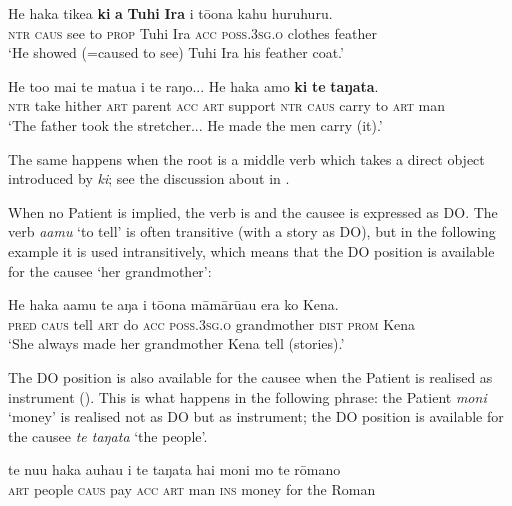 \ea\label{ex:8.234}
\gll He haka tike{\ꞌ}a \textbf{ki} \textbf{a} \textbf{Tuhi} \textbf{Ira} i tō{\ꞌ}ona kahu huruhuru. \\
\textsc{ntr} \textsc{caus} see to \textsc{prop} Tuhi Ira \textsc{acc} \textsc{poss.3sg.o} clothes feather \\

\glt 
‘He showed (=caused to see) Tuhi Ira his feather coat.’ \textstyleExampleref{[Fel-33-011]}
\z

\ea\label{ex:8.235}
\gll He to{\ꞌ}o mai te matu{\ꞌ}a i te raŋo... He haka {\ꞌ}amo \textbf{ki} \textbf{te} \textbf{taŋata}.\\
\textsc{ntr} take hither \textsc{art} parent \textsc{acc} \textsc{art} support \textsc{ntr} \textsc{caus} carry to \textsc{art} man\\

\glt
‘The father took the stretcher... He made the men carry (it).’ \textstyleExampleref{[Mtx-7-13.044]}
\z

The same happens when the root is a middle verb which takes a direct object introduced by \textit{ki}; see the discussion about  in .

When no Patient is implied, the verb is  and the causee is expressed as DO. The verb \textit{{\ꞌ}a{\ꞌ}amu} ‘to tell’ is often transitive (with a story as DO), but in the following example it is used intransitively, which means that the DO position is available for the causee ‘her grandmother’:

\ea\label{ex:8.236}
\gll He haka {\ꞌ}a{\ꞌ}amu te aŋa i tō{\ꞌ}ona māmārū{\ꞌ}au era ko Kena. \\
\textsc{pred} \textsc{caus} tell \textsc{art} do \textsc{acc} \textsc{poss.3sg.o} grandmother \textsc{dist} \textsc{prom} Kena \\

\glt
‘She always made her grandmother Kena tell (stories).’ \textstyleExampleref{[R380.015]} 
\z

The DO position is also available for the causee when the Patient is realised as instrument (). This is what happens in the following phrase: the Patient \textit{moni} ‘money’ is realised not as DO but as instrument; the DO position is available for the causee \textit{te taŋata} ‘the people’.

\ea\label{ex:8.237}
\gll te nu{\ꞌ}u haka {\ꞌ}auhau i te taŋata hai moni mo te rōmano\\
\textsc{art} people \textsc{caus} pay \textsc{acc} \textsc{art} man \textsc{ins} money for the Roman\\

